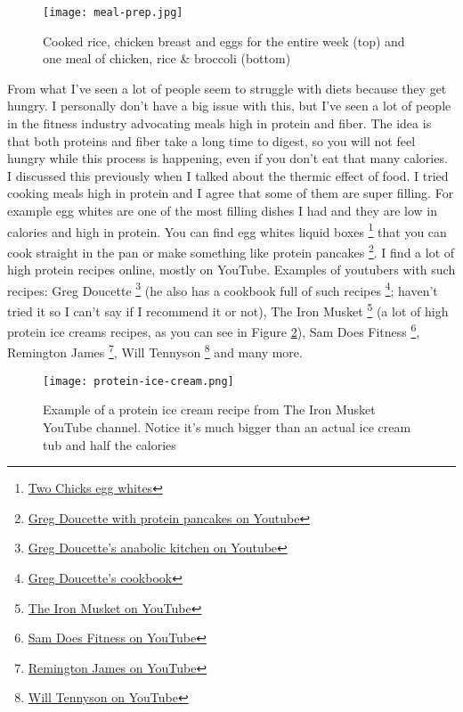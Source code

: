 \documentclass[openany, 12pt]{book}
\begin{document}
	\begin{figure}[h]
		\centering
		\texttt{[image: meal-prep.jpg]}
		\caption{Cooked rice, chicken breast and eggs for the entire week (top) and one meal of chicken, rice \& broccoli (bottom)}
		\label{fig5}
	\end{figure}

        From what I've seen a lot of people seem to struggle with diets because they get hungry. I personally don't have a big issue with this, but I've seen a lot of people in 
        the fitness industry advocating meals high in protein and fiber. The idea is that both proteins and fiber take a long time to digest, so you will not feel hungry while
        this process is happening, even if you don't eat that many calories. I discussed this previously when I talked about the thermic effect of food.
        I tried cooking meals high in protein and I agree that some of them are super filling. For example egg whites are
        one of the most filling dishes I had and they are low in calories and high in protein. You can find egg whites liquid boxes
        \footnote{\href{https://twochicks.co.uk}{Two Chicks egg whites}} that you can cook straight in
        the pan or make something like protein pancakes
        \footnote{\href{https://www.youtube.com/watch?v=aDJ8K_gqzdI}{Greg Doucette with protein pancakes on Youtube}}. 
        I find a lot of high protein recipes online, mostly on YouTube. Examples of youtubers with such recipes: Greg Doucette
        \footnote{\href{https://www.youtube.com/playlist?list=PLNAZHiu0ASAprWRUxQHAiHG1FhlJbyeIm}{Greg Doucette's anabolic kitchen on Youtube}}
        (he also has a cookbook full of such recipes
        \footnote{\href{https://www.gregdoucette.com/products/cookbook-2}{Greg Doucette's cookbook}}; haven't
        tried it so I can't say if I recommend it or not), The Iron Musket
        \footnote{\href{https://www.youtube.com/channel/UC3Pec4Q-1CEc9WXjVk2z6Bg}{The Iron Musket on YouTube}}
        (a lot of high protein ice creams recipes, as you can see in Figure \ref{fig6}), Sam Does Fitness
        \footnote{\href{https://www.youtube.com/channel/UC8JUC4wItW2EwpeMkCSyRUw/}{Sam Does Fitness on YouTube}}, Remington James
        \footnote{\href{https://www.youtube.com/channel/UCO9Rhj_x_GgJl-Ria7257EA}{Remington James on YouTube}}, Will Tennyson
        \footnote{\href{https://www.youtube.com/channel/UCB2wtYpfbCpYDc5TeTwuqFA}{Will Tennyson on YouTube}} and many more.

	\begin{figure}[h]
		\centering
		\texttt{[image: protein-ice-cream.png]}
		\caption{Example of a protein ice cream recipe from The Iron Musket YouTube channel. Notice it's much bigger than an actual ice cream tub and half the calories}
		\label{fig6}
	\end{figure}
\end{document}
